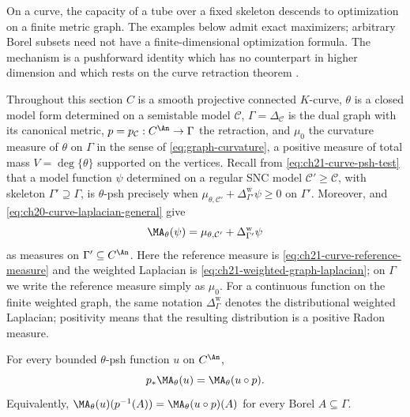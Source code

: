 On a curve, the capacity of a tube over a fixed skeleton descends to
optimization on a finite metric graph.  The examples below admit exact
maximizers; arbitrary Borel subsets need not have a finite-dimensional
optimization formula.  The mechanism is a pushforward identity
which has no counterpart in higher dimension and which rests on the curve
retraction theorem .

Throughout this section $C$ is a smooth projective connected $K$-curve,
$\theta$ is a closed model form determined on a semistable model
$\mathcal C$, $\Gamma=\Delta_{\mathcal C}$ is the dual graph with its
canonical metric, $p=p_{\mathcal C}:C^{\An}\to\Gamma$ the retraction, and
$\mu_0$ the curvature measure of $\theta$ on $\Gamma$ in the sense of
\eqref{eq:graph-curvature}, a positive measure of total mass $V=\deg\{\theta\}$
supported on the vertices.  Recall from \eqref{eq:ch21-curve-psh-test} that a
model function $\psi$ determined on a regular SNC model
$\mathcal C'\geq\mathcal C$, with skeleton
$\Gamma'\supseteq\Gamma$, is $\theta$-psh precisely when
$\mu_{\theta,\mathcal C'}+
\Delta^{\mathrm w}_{\Gamma'}\psi\geq0$ on $\Gamma'$.  Moreover,
 and
\eqref{eq:ch20-curve-laplacian-general} give
\begin{equation}
\label{eq:ch25-curve-ma}
 \MA_\theta(\psi)
 =\mu_{\theta,\mathcal C'}+\Delta^{\mathrm w}_{\Gamma'}\psi
\end{equation}
as measures on $\Gamma'\subseteq C^{\An}$.  Here the reference measure is
\eqref{eq:ch21-curve-reference-measure} and the weighted Laplacian is
\eqref{eq:ch21-weighted-graph-laplacian}; on $\Gamma$ we write the
reference measure simply as $\mu_0$.
For a continuous function on the finite weighted graph, the same notation
$\Delta^{\mathrm w}_\Gamma$ denotes the distributional weighted
Laplacian; positivity means that the resulting distribution is a positive
Radon measure.

\begin{proposition}
\label{prop:ch25-curve-pushforward}
For every bounded $\theta$-psh function $u$ on $C^{\An}$,
\begin{equation}
\label{eq:ch25-curve-pushforward}
 p_*\MA_\theta(u)=\MA_\theta(u\circ p).
\end{equation}
Equivalently, $\MA_\theta(u)(p^{-1}(A))=\MA_\theta(u\circ p)(A)$ for every
Borel $A\subseteq\Gamma$.
\end{proposition}


